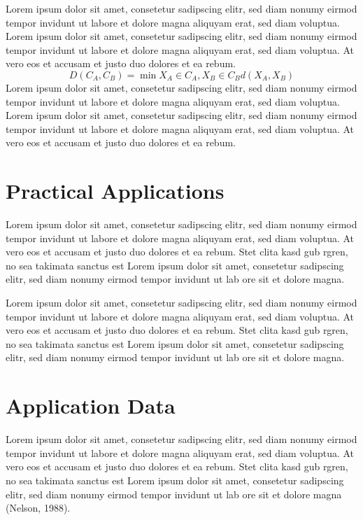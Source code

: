 Lorem ipsum dolor sit amet, consetetur sadipscing elitr, sed diam nonumy eirmod tempor invidunt ut labore et dolore magna aliquyam erat, sed diam voluptua. Lorem ipsum dolor sit amet, consetetur sadipscing elitr, sed diam nonumy eirmod tempor invidunt ut labore et dolore magna aliquyam erat, sed diam voluptua. At vero eos et accusam et justo duo dolores et ea rebum. 
\begin{equation}
D\left(C_{A},C_{B}\right) = \min X_{A}\in C_{A},X_{B}\in C_{B} 
d\left(X_{A},X_{B}\right)
\label{Eq3.2}
\end{equation}
Lorem ipsum dolor sit amet, consetetur sadipscing elitr, sed diam nonumy eirmod tempor invidunt ut labore et dolore magna aliquyam erat, sed diam voluptua. Lorem ipsum dolor sit amet, consetetur sadipscing elitr, sed diam nonumy eirmod tempor invidunt ut labore et dolore magna aliquyam erat, sed diam voluptua. At vero eos et accusam et justo duo dolores et ea rebum. 

\section{Practical Applications}

Lorem ipsum dolor sit amet, consetetur sadipscing elitr, sed diam nonumy eirmod tempor invidunt ut labore et dolore magna aliquyam erat, sed diam voluptua. At vero eos et accusam et justo duo dolores et ea rebum. Stet clita kasd gub rgren, no sea takimata sanctus est Lorem ipsum dolor sit amet, consetetur sadipscing elitr, sed diam nonumy eirmod tempor invidunt ut lab ore sit et dolore magna.

Lorem ipsum dolor sit amet, consetetur sadipscing elitr, sed diam nonumy eirmod tempor invidunt ut labore et dolore magna aliquyam erat, sed diam voluptua. At vero eos et accusam et justo duo dolores et ea rebum. Stet clita kasd gub rgren, no sea takimata sanctus est Lorem ipsum dolor sit amet, consetetur sadipscing elitr, sed diam nonumy eirmod tempor invidunt ut lab ore sit et dolore magna.

\section{Application Data}

Lorem ipsum dolor sit amet, consetetur sadipscing elitr, sed diam nonumy eirmod tempor invidunt ut labore et dolore magna aliquyam erat, sed diam voluptua. At vero eos et accusam et justo duo dolores et ea rebum. Stet clita kasd gub rgren, no sea takimata sanctus est Lorem ipsum dolor sit amet, consetetur sadipscing elitr, sed diam nonumy eirmod tempor invidunt ut lab ore sit et dolore magna (Nelson, 1988).

